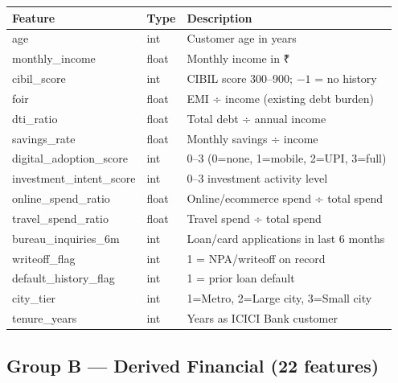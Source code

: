 \documentclass[12pt,a4paper]{article}
\begin{document}
\begin{tabular}{lll}
\toprule
\textbf{Feature} & \textbf{Type} & \textbf{Description} \\
\midrule
age & int & Customer age in years \\
monthly\_income & float & Monthly income in ₹ \\
cibil\_score & int & CIBIL score 300--900; $-1$ = no history \\
foir & float & EMI ÷ income (existing debt burden) \\
dti\_ratio & float & Total debt ÷ annual income \\
savings\_rate & float & Monthly savings ÷ income \\
digital\_adoption\_score & int & 0--3 (0=none, 1=mobile, 2=UPI, 3=full) \\
investment\_intent\_score & int & 0--3 investment activity level \\
online\_spend\_ratio & float & Online/ecommerce spend ÷ total spend \\
travel\_spend\_ratio & float & Travel spend ÷ total spend \\
bureau\_inquiries\_6m & int & Loan/card applications in last 6 months \\
writeoff\_flag & int & 1 = NPA/writeoff on record \\
default\_history\_flag & int & 1 = prior loan default \\
city\_tier & int & 1=Metro, 2=Large city, 3=Small city \\
tenure\_years & int & Years as ICICI Bank customer \\
\bottomrule
\end{tabular}

\subsection{Group B — Derived Financial (22 features)}
\end{document}
